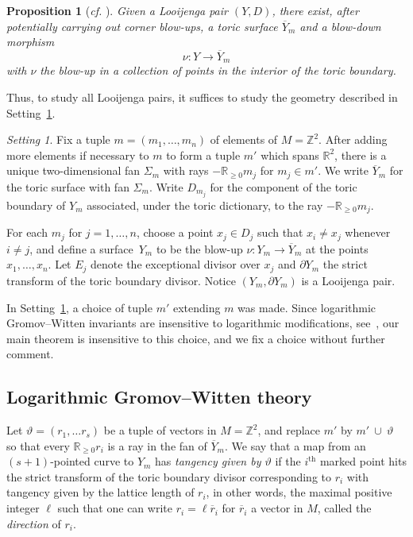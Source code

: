 \documentclass[11pt]{amsart}
\numberwithin{equation}{section}
\theoremstyle{plain}
\newtheorem{proposition}[theorem]{Proposition}
\theoremstyle{remark}
\newtheorem{setting}[theorem]{Setting}
\theoremstyle{definition}
\newcommand{\RR}{\mathbb{R}}
\newcommand{\ZZ}{\mathbb{Z}}
\newcommand{\supth}[1]{\ensuremath{#1^{\mathrm{th}}}}
\begin{document}
\begin{proposition}[\textit{cf.} {\cite[Proposition 1.3]{gross2015mirror}}]
  Given a Looijenga pair $(Y,D)$, there exist, after potentially carrying out corner blow-ups, a toric surface $\overline{Y}_m$ and a blow-down morphism
  $$\nu\colon Y \longrightarrow \overline{Y}_m$$
  with $\nu$ the blow-up in a collection of points in the interior of the toric boundary.
\end{proposition}

Thus, to study all Looijenga pairs, it suffices to study the geometry described in Setting~\ref{setting:basic}. 

\begin{setting}\label{setting:basic}
    Fix a tuple $m = (m_1,\dots,m_n)$ of elements of $M = \ZZ^2$. After adding more elements if necessary to $m$ to form a tuple $m'$ which spans $\RR^2$, there is a unique two-dimensional fan $\Sigma_m$ with rays $-\RR_{\geq 0}m_j$ for $m_j \in m'$. We write $\overline{Y}_m$ for the toric surface with fan $\Sigma_m$. Write $D_{m_j}$ for the component of the toric boundary of $Y_m$ associated, under the toric dictionary, to the ray $-\RR_{\geq 0} m_j$.  
    
    For each $m_j$ for $j=1,\dots,n$, choose a point $x_j\in D_j$ such that $x_i \ne x_j$ whenever $i\ne j$, and define a surface~$Y_m$ to be the blow-up $\nu\colon Y_m \rightarrow \overline{Y}_m$ at the points $x_1,\dots,x_n$. Let $E_j$ denote the exceptional divisor over $x_j$ and $\partial Y_m$ the strict transform of the toric boundary divisor. Notice $(Y_m,\partial Y_m)$ is a Looijenga pair.
\end{setting}

In Setting~\ref{setting:basic}, a choice of tuple $m'$ extending $m$ was made. Since logarithmic Gromov--Witten invariants are insensitive to logarithmic modifications, see~\cite[Theorem 1.1.1]{AWbirational}, our main theorem is insensitive to this choice, and we fix a choice without further comment. 

\subsection{Logarithmic Gromov--Witten theory}
Let $\vartheta = (r_1,\dots r_s)$ be a tuple of vectors in $M=\ZZ^2$, and replace $m'$ by $m'~\cup~\vartheta$ so that every $\RR_{\geq 0}r_i$ is a ray in the fan of $\overline{Y}_m$. We say that a map from an $(s + 1)$-pointed curve to ${Y}_m$ has \emph{tangency given by $\vartheta$} if the $\supth{i}$ marked point hits the strict transform of the toric boundary divisor corresponding to $r_i$ with tangency given by the lattice length of $r_i$, in other words, the maximal positive integer $\ell$ such that one can write $r_i = \ell \overline{r}_i$ for $\overline{r}_i$ a vector in $M$, called the \textit{direction} of $r_i$.
\end{document}
